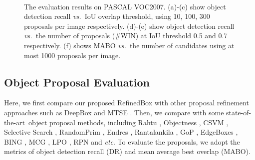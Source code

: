 \documentclass[letterpaper]{article} %
\def\etc{\emph{etc}}
\def\vs{\emph{vs.~}}
\def\sArt{{state-of-the-art~}}
\begin{document}
\begin{figure}[!htbp]
   \\
  \caption{The evaluation results on PASCAL VOC2007. (a)-(c) show object detection recall
  	\vs IoU overlap threshold, using 10, 100, 300 proposals per image respectively.
    (d)-(e) show object detection recall \vs the number of proposals (\#WIN) at IoU
    threshold 0.5 and 0.7 respectively. (f) shows MABO \vs the number of candidates
    using at most 1000 proposals per image.}
  \label{fig:voc-evaluation}
\end{figure}


\subsection{Object Proposal Evaluation}
%
Here, we first compare our proposed RefinedBox with other proposal refinement
approaches such as DeepBox \cite{kuo2015deepbox} and MTSE \cite{chen2015improving}.
Then, we compare with some \sArt object proposal methods, including
Rahtu \cite{rahtu2011learning},
Objectness \cite{alexe2012measuring},
CSVM \cite{zhang2016object},
Selective Search \cite{uijlings2013selective},
RandomPrim \cite{manen2013prime},
Endres \cite{endres2014category},
Rantalankila \cite{rantalankila2014generating},
GoP \cite{krahenbuhl2014geodesic},
EdgeBoxes \cite{zitnick2014edge},
BING \cite{cheng2014bing},
MCG \cite{arbelaez2014multiscale},
LPO \cite{krahenbuhl2015learning},
RPN \cite{ren2015faster} and \etc.
To evaluate the proposals, we adopt the metrics of object detection recall (DR)
and mean average best overlap (MABO).


\newcommand{\gEm}[1]{\underline{\bf #1}}
\newcommand{\tablefont}{\fontsize{8.2pt}{\baselineskip}\selectfont}
\end{document}
